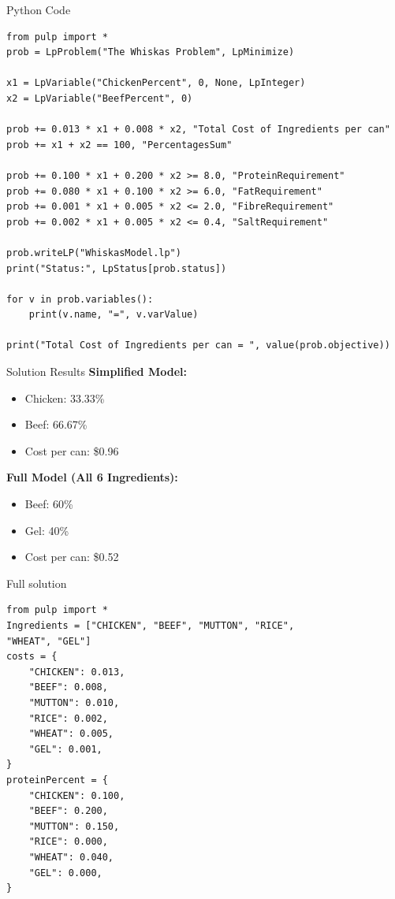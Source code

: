 \documentclass{purdue-slide}
\begin{document}
\begin{frame}[fragile]{Python Code}

	\begin{verbatim}
from pulp import *
prob = LpProblem("The Whiskas Problem", LpMinimize)

x1 = LpVariable("ChickenPercent", 0, None, LpInteger)
x2 = LpVariable("BeefPercent", 0)

prob += 0.013 * x1 + 0.008 * x2, "Total Cost of Ingredients per can"
prob += x1 + x2 == 100, "PercentagesSum"

prob += 0.100 * x1 + 0.200 * x2 >= 8.0, "ProteinRequirement"
prob += 0.080 * x1 + 0.100 * x2 >= 6.0, "FatRequirement"
prob += 0.001 * x1 + 0.005 * x2 <= 2.0, "FibreRequirement"
prob += 0.002 * x1 + 0.005 * x2 <= 0.4, "SaltRequirement"

prob.writeLP("WhiskasModel.lp")
print("Status:", LpStatus[prob.status])

for v in prob.variables():
	print(v.name, "=", v.varValue)

print("Total Cost of Ingredients per can = ", value(prob.objective))
\end{verbatim}

\end{frame}

\begin{frame}{Solution Results}
	\textbf{Simplified Model:}
	\begin{itemize}
		\item Chicken: 33.33\%
		\item Beef: 66.67\%
		\item Cost per can: \$0.96
	\end{itemize}

	\bigskip

	\textbf{Full Model (All 6 Ingredients):}
	\begin{itemize}
		\item Beef: 60\%
		\item Gel: 40\%
		\item Cost per can: \$0.52
	\end{itemize}
\end{frame}

\begin{frame}[fragile]{Full solution}
    \begin{verbatim}
from pulp import *
Ingredients = ["CHICKEN", "BEEF", "MUTTON", "RICE",
"WHEAT", "GEL"]
costs = {
	"CHICKEN": 0.013,
	"BEEF": 0.008,
	"MUTTON": 0.010,
	"RICE": 0.002,
	"WHEAT": 0.005,
	"GEL": 0.001,
}
proteinPercent = {
	"CHICKEN": 0.100,
	"BEEF": 0.200,
	"MUTTON": 0.150,
	"RICE": 0.000,
	"WHEAT": 0.040,
	"GEL": 0.000,
}
    \end{verbatim}
\end{frame}
\end{document}

